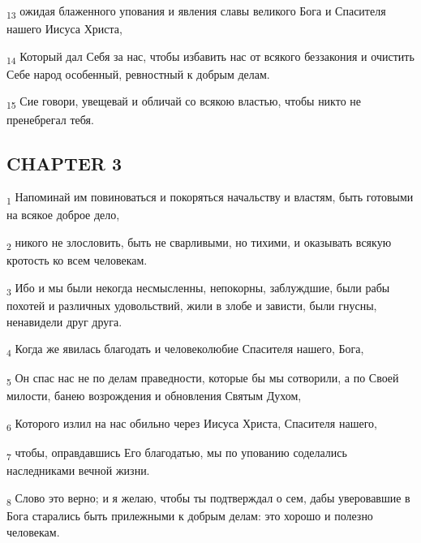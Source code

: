 \begin{tcolorbox}
\textsubscript{13} ожидая блаженного упования и явления славы великого Бога и Спасителя нашего Иисуса Христа,
\end{tcolorbox}
\begin{tcolorbox}
\textsubscript{14} Который дал Себя за нас, чтобы избавить нас от всякого беззакония и очистить Себе народ особенный, ревностный к добрым делам.
\end{tcolorbox}
\begin{tcolorbox}
\textsubscript{15} Сие говори, увещевай и обличай со всякою властью, чтобы никто не пренебрегал тебя.
\end{tcolorbox}
\subsection{CHAPTER 3}
\begin{tcolorbox}
\textsubscript{1} Напоминай им повиноваться и покоряться начальству и властям, быть готовыми на всякое доброе дело,
\end{tcolorbox}
\begin{tcolorbox}
\textsubscript{2} никого не злословить, быть не сварливыми, но тихими, и оказывать всякую кротость ко всем человекам.
\end{tcolorbox}
\begin{tcolorbox}
\textsubscript{3} Ибо и мы были некогда несмысленны, непокорны, заблуждшие, были рабы похотей и различных удовольствий, жили в злобе и зависти, были гнусны, ненавидели друг друга.
\end{tcolorbox}
\begin{tcolorbox}
\textsubscript{4} Когда же явилась благодать и человеколюбие Спасителя нашего, Бога,
\end{tcolorbox}
\begin{tcolorbox}
\textsubscript{5} Он спас нас не по делам праведности, которые бы мы сотворили, а по Своей милости, банею возрождения и обновления Святым Духом,
\end{tcolorbox}
\begin{tcolorbox}
\textsubscript{6} Которого излил на нас обильно через Иисуса Христа, Спасителя нашего,
\end{tcolorbox}
\begin{tcolorbox}
\textsubscript{7} чтобы, оправдавшись Его благодатью, мы по упованию соделались наследниками вечной жизни.
\end{tcolorbox}
\begin{tcolorbox}
\textsubscript{8} Слово это верно; и я желаю, чтобы ты подтверждал о сем, дабы уверовавшие в Бога старались быть прилежными к добрым делам: это хорошо и полезно человекам.
\end{tcolorbox}
